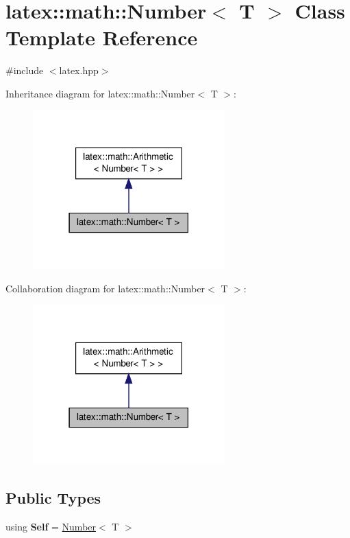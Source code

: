 \hypertarget{classlatex_1_1math_1_1Number}{\section{latex\-:\-:math\-:\-:Number$<$ T $>$ Class Template Reference}
\label{classlatex_1_1math_1_1Number}
}


{\ttfamily \#include $<$latex.\-hpp$>$}



Inheritance diagram for latex\-:\-:math\-:\-:Number$<$ T $>$\-:
\nopagebreak
\begin{figure}[H]
\begin{center}
\leavevmode
\includegraphics[width=210pt]{classlatex_1_1math_1_1Number__inherit__graph}
\end{center}
\end{figure}


Collaboration diagram for latex\-:\-:math\-:\-:Number$<$ T $>$\-:
\nopagebreak
\begin{figure}[H]
\begin{center}
\leavevmode
\includegraphics[width=210pt]{classlatex_1_1math_1_1Number__coll__graph}
\end{center}
\end{figure}
\subsection*{Public Types}
\begin{DoxyCompactItemize}
\item 
\hypertarget{classlatex_1_1math_1_1Number_a0ae5c2f5bd6ad61202cc71f06e8d45b5}{using {\bfseries Self} = \hyperlink{classlatex_1_1math_1_1Number}{Number}$<$ T $>$}\label{classlatex_1_1math_1_1Number_a0ae5c2f5bd6ad61202cc71f06e8d45b5}

\end{DoxyCompactItemize}
